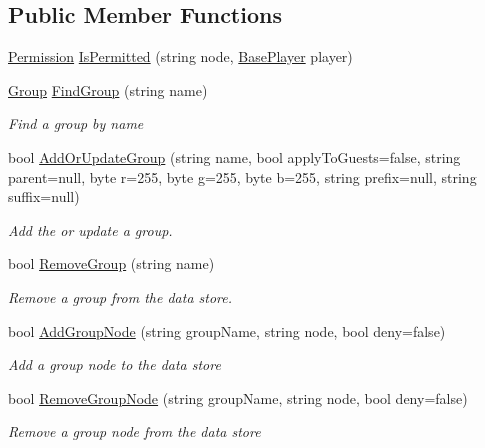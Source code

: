 \subsection*{Public Member Functions}
\begin{DoxyCompactItemize}
\item 
\hyperlink{namespace_o_t_a_1_1_data_acb383d9e681580b5a8710a08fb7c3aef}{Permission} \hyperlink{interface_o_t_a_1_1_data_1_1_i_permission_handler_a927eb305c4ae86bcb9dfa461cb041995}{Is\+Permitted} (string node, \hyperlink{class_o_t_a_1_1_base_player}{Base\+Player} player)
\item 
\hyperlink{class_o_t_a_1_1_data_1_1_group}{Group} \hyperlink{interface_o_t_a_1_1_data_1_1_i_permission_handler_a1ae08dc07d05431250ceb15e5d66dac8}{Find\+Group} (string name)
\begin{DoxyCompactList}\small\item\em Find a group by name \end{DoxyCompactList}\item 
bool \hyperlink{interface_o_t_a_1_1_data_1_1_i_permission_handler_a3c8528820ea08f448bd1ea153c1c7644}{Add\+Or\+Update\+Group} (string name, bool apply\+To\+Guests=false, string parent=null, byte r=255, byte g=255, byte b=255, string prefix=null, string suffix=null)
\begin{DoxyCompactList}\small\item\em Add the or update a group. \end{DoxyCompactList}\item 
bool \hyperlink{interface_o_t_a_1_1_data_1_1_i_permission_handler_a10772aa23ce1abe4c98e4e93fe068978}{Remove\+Group} (string name)
\begin{DoxyCompactList}\small\item\em Remove a group from the data store. \end{DoxyCompactList}\item 
bool \hyperlink{interface_o_t_a_1_1_data_1_1_i_permission_handler_a7e47bfa7cc400a772f4b90c6eb81deeb}{Add\+Group\+Node} (string group\+Name, string node, bool deny=false)
\begin{DoxyCompactList}\small\item\em Add a group node to the data store \end{DoxyCompactList}\item 
bool \hyperlink{interface_o_t_a_1_1_data_1_1_i_permission_handler_a1bae4eaa509aef2407bea474f06592c4}{Remove\+Group\+Node} (string group\+Name, string node, bool deny=false)
\begin{DoxyCompactList}\small\item\em Remove a group node from the data store \end{DoxyCompactList}\item 

\end{DoxyCompactItemize}

